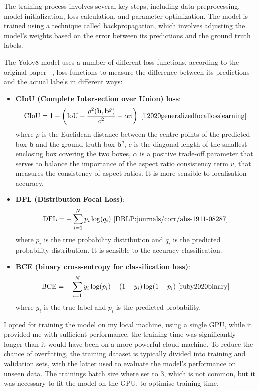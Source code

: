 The training process involves several key steps, including data preprocessing, model initialization,
loss calculation, and parameter optimization.
The model is trained using a technique called backpropagation, which involves adjusting the model's weights based on
the error between its predictions and the ground truth labels.

The Yolov8 model uses a number of different loss functions, according to the original paper~\cite{redmon2016lookonceunifiedrealtime}
, loss functions to measure the difference between its predictions and the actual labels in different ways:
\newpage


\begin{itemize}
\item \textbf{CIoU (Complete Intersection over Union) loss}:
\begin{equation}
\text{CIoU} = 1 - \left( \text{IoU} - \frac{\rho^2(\mathbf{b}, \mathbf{b}^g)}{c^2} - \alpha v \right) ~\cite{li2020generalizedfocallosslearning}\label{eq:equation3}
\end{equation}
where \(\rho\) is the Euclidean distance between the centre-points of the predicted box \(\mathbf{b}\) and
 the ground truth box \(\mathbf{b}^g\), \(c\) is the diagonal length of the smallest enclosing box covering
 the two boxes, \(\alpha\) is a positive trade-off parameter that serves to balance the importance of the aspect ratio consistency term \(v\),  that measures the consistency of aspect
 ratios.
 It is more sensible to localisation accuracy.

\item \textbf{DFL (Distribution Focal Loss)}:
\begin{equation}
\text{DFL} = -\sum_{i=1}^{N} p_i \log(q_i)~\cite{DBLP:journals/corr/abs-1911-08287}\label{eq:equation2}
\end{equation}
where \(p_i\) is the true probability distribution and \(q_i\) is the predicted probability distribution.
It is sensible to the accuracy classification.
\item \textbf{BCE (binary cross-entropy for classification loss)}:
\begin{equation}
\text{BCE} = -\sum_{i=1}^{N} y_i \log(p_i) + (1 - y_i) \log(1 - p_i)~\cite{ruby2020binary}\label{eq:equation}
\end{equation}
where \(y_i\) is the true label and \(p_i\) is the predicted probability.

\end{itemize}



I opted for training the model on my local machine, using a single GPU, while it provided me with sufficient performance, the training time was significantly longer than it would have been on a more powerful cloud machine.
To reduce the chance of overfitting, the training dataset is typically divided into training and validation sets,
with the latter used to evaluate the model's performance on unseen data.
The trainings batch size where set to 3, which is not common, but it was necessary to fit the model on the GPU,
to optimise training time.

\newpage